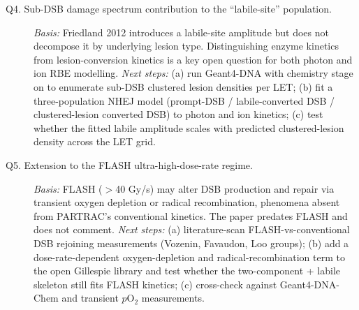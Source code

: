 \begin{description}
\item[Q4. Sub-DSB damage spectrum contribution to the ``labile-site'' population.]
\textit{Basis:} Friedland 2012 introduces a labile-site amplitude but does not
decompose it by underlying lesion type. Distinguishing enzyme kinetics from
lesion-conversion kinetics is a key open question for both photon and ion RBE
modelling.
\textit{Next steps:} (a) run Geant4-DNA with chemistry stage on to enumerate
sub-DSB clustered lesion densities per LET; (b) fit a three-population NHEJ
model (prompt-DSB / labile-converted DSB / clustered-lesion converted DSB) to
photon and ion kinetics; (c) test whether the fitted labile amplitude scales
with predicted clustered-lesion density across the LET grid.

\item[Q5. Extension to the FLASH ultra-high-dose-rate regime.]
\textit{Basis:} FLASH ($>$40 Gy/s) may alter DSB production and repair via
transient oxygen depletion or radical recombination, phenomena absent from
PARTRAC's conventional kinetics. The paper predates FLASH and does not
comment.
\textit{Next steps:} (a) literature-scan FLASH-vs-conventional DSB rejoining
measurements (Vozenin, Favaudon, Loo groups); (b) add a dose-rate-dependent
oxygen-depletion and radical-recombination term to the open Gillespie library
and test whether the two-component + labile skeleton still fits FLASH
kinetics; (c) cross-check against Geant4-DNA-Chem and transient $p$O$_2$
measurements.
\end{description}
